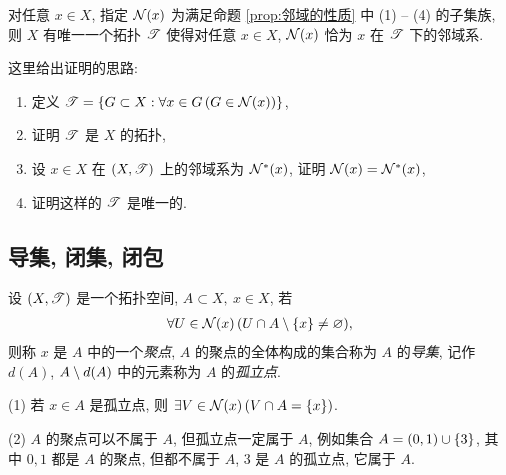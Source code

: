     \begin{Theorem}[用邻域定义拓扑]
        对任意 $ x\in X $, 指定 $ \mathcal{N}(x) $ 为满足命题 \ref{prop:邻域的性质} 中 (1) -- (4) 的子集族, 则 $ X $ 有唯一一个拓扑 $ \mathscr{T} $ 使得对任意 $ x\in X $, $ \mathcal{N}(x) $ 恰为 $ x $ 在 $ \mathscr{T} $  下的邻域系.
    \end{Theorem}
    \begin{Proof}
        这里给出证明的思路:
        \begin{enumerate}
            \item 定义 $ \mathscr{T}=\left\{ G\subset X: \forall x\in G\,(G\in\mathcal{N}(x)) \right\} $,
            \item 证明 $ \mathscr{T} $ 是 $ X $ 的拓扑,
            \item 设 $ x\in X $ 在 $ (X, \mathscr{T}) $ 上的邻域系为 $ \mathcal{N}^{*}(x) $, 证明 $ \mathcal{N}(x)=\mathcal{N}^{*}(x) $,
            \item 证明这样的 $ \mathscr{T} $ 是唯一的. 
        \end{enumerate}
    \end{Proof}

\subsection{导集, 闭集, 闭包}
    \begin{Definition}[聚点, 导集, 孤立点]
        设 $ (X, \mathscr{T}) $ 是一个拓扑空间, $ A\subset X,\ x\in X $, 若
        \begin{align*}
            \forall U\in\mathcal{N}(x)\,(U\cap A\setminus\left\{ x \right\}\neq \varnothing),
        \end{align*}
        则称 $ x $ 是 $ A $ 中的一个\emph{聚点}, $ A $ 的聚点的全体构成的集合称为 $ A $ 的\emph{导集}, 记作 $ d(A) $, $ A\setminus d(A) $ 中的元素称为 $ A $ 的\emph{孤立点}.
    \end{Definition}

    \begin{Remark}
        (1) 若 $ x\in A $ 是孤立点, 则 $ \exists V\in \mathcal{N}(x)\,(V\cap A=\left\{ x \right\}) $.

        (2) $ A $ 的聚点可以不属于 $ A $, 但孤立点一定属于 $ A $, 例如集合 $ A=(0, 1)\cup\left\{ 3 \right\} $, 其中 $ 0, 1 $ 都是 $ A $ 的聚点, 但都不属于 $ A $, $ 3 $ 是 $ A $ 的孤立点, 它属于 $ A $. 
    \end{Remark}

